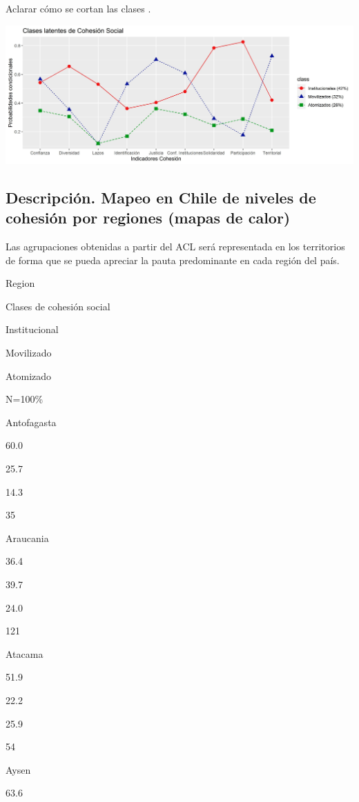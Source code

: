 \documentclass[
  12pt,
]{book}
\begin{document}
Aclarar cómo se cortan las clases .

\begin{center}\includegraphics[width=1\linewidth,height=1\textheight]{output/graphs/lca3} \end{center}

\hypertarget{descripciuxf3n.-mapeo-en-chile-de-niveles-de-cohesiuxf3n-por-regiones-mapas-de-calor}{%
\subsection{Descripción. Mapeo en Chile de niveles de cohesión por regiones (mapas de calor)}\label{descripciuxf3n.-mapeo-en-chile-de-niveles-de-cohesiuxf3n-por-regiones-mapas-de-calor}}

Las agrupaciones obtenidas a partir del ACL será representada en los territorios de forma que se pueda apreciar la pauta predominante en cada región del país.

Region

Clases de cohesión social

Institucional

Movilizado

Atomizado

N=100\%

Antofagasta

60.0

25.7

14.3

35

Araucania

36.4

39.7

24.0

121

Atacama

51.9

22.2

25.9

54

Aysen

63.6
\end{document}
